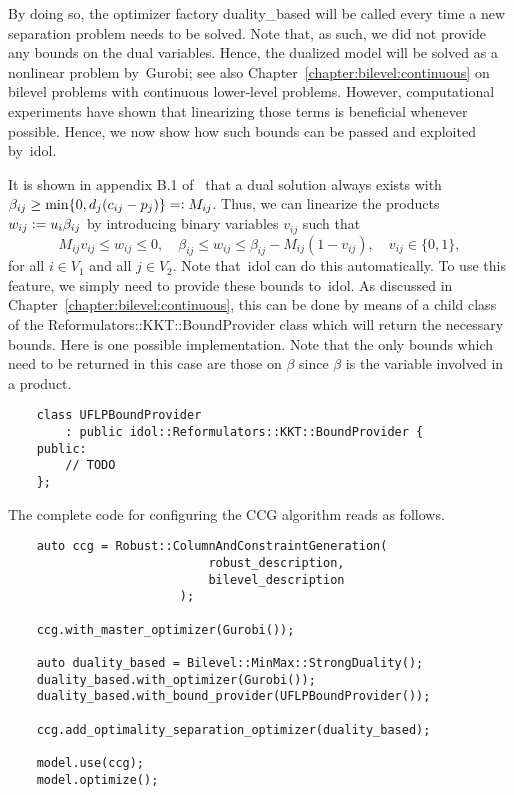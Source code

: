 By doing so, the optimizer factory \textsf{duality\_based} will be called
every time a new separation problem needs to be solved. Note that, as such, we
did not provide any bounds on the dual variables. Hence, the dualized model
will be solved as a nonlinear problem by~\textsf{Gurobi}; see also
Chapter~\ref{chapter:bilevel:continuous} on bilevel problems with continuous
lower-level problems. However, computational experiments have shown that
linearizing those terms is beneficial whenever possible. Hence, we now show
how such bounds can be passed and exploited by~\textsf{idol}.

It is shown in appendix B.1 of~\textcite{Cheng2021} that a dual solution
always exists with $\beta_{ij} \ge \min\{ 0, d_j(c_{ij} - p_j) \} \mathrel{{=}{\mathop:}}
M_{ij}$. Thus, we can linearize the products $w_{ij} \mathrel{{\mathop:}{=}} u_i\beta_{ij}$ by
introducing binary variables $v_{ij}$ such that 
\begin{equation}
    M_{ij}v_{ij} \le w_{ij} \le 0, \quad 
    \beta_{ij} \le w_{ij} \le \beta_{ij} - M_{ij}(1 - v_{ij}), \quad 
    v_{ij} \in \{0,1\},
    \label{eq:ccg:uflp:dual:mccormick}
\end{equation}
for all $i\in V_1$ and all $j\in V_2$. Note that~\textsf{idol} can do this
automatically. To use this feature, we simply need to provide these bounds
to~\textsf{idol}. As discussed in Chapter~\ref{chapter:bilevel:continuous},
this can be done by means of a child class of the
\textsf{Reformulators::KKT::BoundProvider} class which will return the
necessary bounds. Here is one possible implementation. Note that the only
bounds which need to be returned in this case are those on $\beta$ since
$\beta$ is the variable involved in a product.
%
\begin{lstlisting}
    class UFLPBoundProvider
        : public idol::Reformulators::KKT::BoundProvider {
    public:
        // TODO
    };
\end{lstlisting}

The complete code for configuring the CCG algorithm reads as follows. 

\begin{lstlisting}
    auto ccg = Robust::ColumnAndConstraintGeneration(
                            robust_description,
                            bilevel_description
                        );
    
    ccg.with_master_optimizer(Gurobi());

    auto duality_based = Bilevel::MinMax::StrongDuality();
    duality_based.with_optimizer(Gurobi());
    duality_based.with_bound_provider(UFLPBoundProvider());

    ccg.add_optimality_separation_optimizer(duality_based);

    model.use(ccg);
    model.optimize();
\end{lstlisting}

